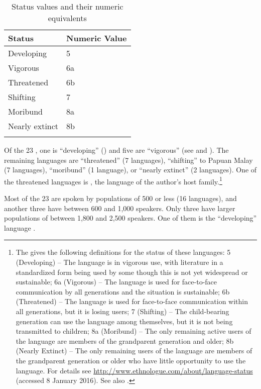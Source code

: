 \largerpage[2]
\begin{table}[h]
\caption{Status values and their numeric equivalents}\label{Table_1.0}
\begin{tabular}{ll}
\lsptoprule
Status & Numeric Value\\
\midrule
Developing & 5\\
Vigorous & 6a\\
Threatened & 6b\\
Shifting & 7\\
Moribund & 8a\\
Nearly extinct & 8b\\
\lspbottomrule
\end{tabular}
\end{table}
\clearpage

Of the 23 , one is  ``developing'' () and five are  ``vigorous'' (see  and ). The remaining languages are  ``threatened'' (7 languages),  ``shifting'' to Papuan Malay (7 languages),  ``moribund'' (1 language), or  ``nearly extinct'' (2 languages). One of the threatened languages is , the language of the author’s host family.\footnote{\label{Footnote_1.10}The  {\citep{Lewis.2016b}} gives the following definitions for the status of these languages: 5 (Developing) – The language is in vigorous use, with literature in a standardized form being used by some though this is not yet widespread or sustainable; 6a (Vigorous) – The language is used for face-to-face communication by all generations and the situation is sustainable; 6b (Threatened) – The language is used for face-to-face communication within all generations, but it is losing users; 7 (Shifting) – The child-bearing generation can use the language among themselves, but it is not being transmitted to children; 8a (Moribund) – The only remaining active users of the language are members of the grandparent generation and older; 8b (Nearly Extinct) – The only remaining users of the language are members of the grandparent generation or older who have little opportunity to use the language. For details see \url{http://www.ethnologue.com/about/language-status} (accessed 8 January 2016). See also .}


Most of the 23  are spoken by populations of 500 or less (16 languages), and another three have between 600 and 1,000 speakers. Only three have larger populations of between 1,800 and 2,500 speakers. One of them is the  ``developing'' language .




